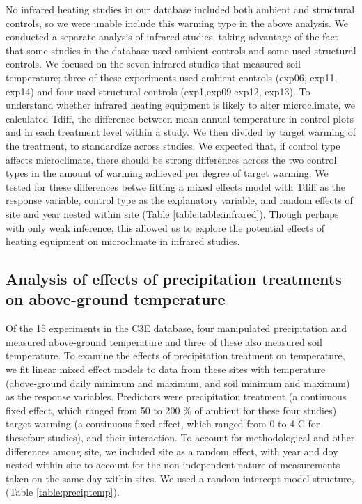 \documentclass{article}
\begin{document}
\par No infrared heating studies in our database included both ambient and structural controls, so we were unable include this warming type in the above analysis. We conducted a separate analysis of infrared studies, taking advantage of the fact that some studies in the database used ambient controls and some used structural controls. We focused on the seven infrared studies that measured soil temperature; three of these experiments used ambient controls (exp06, exp11, exp14) and four used structural controls (exp1,exp09,exp12, exp13). To understand whether infrared heating equipment is likely to alter microclimate, we calculated Tdiff, the difference between mean annual temperature in control plots and in each treatment level within a study. We then divided by target warming of the treatment, to standardize across studies. We expected that, if control type affects microclimate, there should be strong differences across the two control types in the amount of warming achieved per degree of target warming. We tested for these differences betwe fitting a mixed effects model with Tdiff as the response variable, control type as the explanatory variable, and random effects of site and year nested within site (Table \ref{table:table:infrared}). Though perhaps with only weak inference, this allowed us to explore the potential effects of heating equipment on microclimate in infrared studies. 
\subsection* {Analysis of effects of precipitation treatments on above-ground temperature}
Of the 15 experiments in the C3E database, four manipulated precipitation and measured above-ground temperature and three of these also measured soil temperature. To examine the effects of precipitation treatment on temperature, we fit linear mixed effect models to data from these sites with temperature (above-ground daily minimum and maximum, and soil minimum and maximum) as the response variables. Predictors were precipitation treatment (a continuous fixed effect, which ranged from 50 to 200 \% of ambient for these four studies), target warming (a continuous fixed effect, which ranged from 0 to 4 \degree C for thesefour studies), and their interaction. To account for methodological and other differences among site, we included site as a random effect, with year and doy nested within site to account for the non-independent nature of measurements taken on the same day within sites. We used a random intercept model structure, (Table \ref{table:preciptemp}). 
\end{document}
